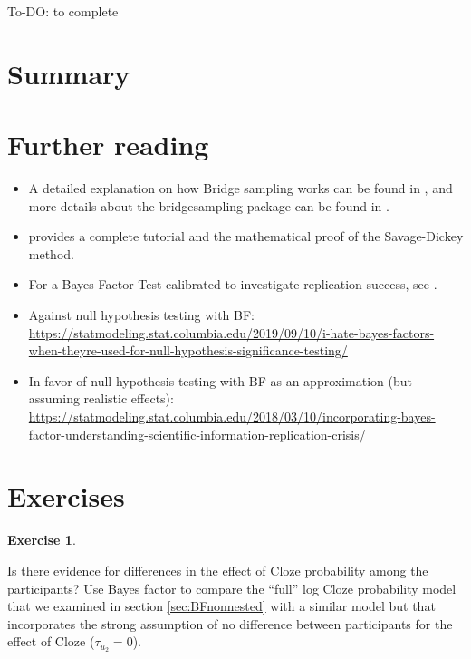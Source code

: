 \documentclass[12pt,]{krantz}
\providecommand{\tightlist}{%
  \setlength{\itemsep}{0pt}\setlength{\parskip}{0pt}}
\theoremstyle{definition}
\theoremstyle{definition}
\theoremstyle{definition}
\newtheorem{exercise}{Exercise}[chapter]
\theoremstyle{remark}
\begin{document}
To-DO: to complete

\hypertarget{summary-4}{%
\section{Summary}\label{summary-4}}

\hypertarget{further-reading-6}{%
\section{Further reading}\label{further-reading-6}}

\begin{itemize}
\tightlist
\item
  A detailed explanation on how Bridge sampling works can be found in \citet{gronauTutorialBridgeSampling2017}, and more details about the bridgesampling package can be found in \citet{gronauBridgesamplingPackageEstimating2017}.
\item
  \citet{wagenmakers2010BayesianHypothesisTesting} provides a complete tutorial and the mathematical proof of the Savage-Dickey method.
\item
  For a Bayes Factor Test calibrated to investigate replication success, see \citet{verhagenBayesianTestsQuantify2014}.
\item
  Against null hypothesis testing with BF: \url{https://statmodeling.stat.columbia.edu/2019/09/10/i-hate-bayes-factors-when-theyre-used-for-null-hypothesis-significance-testing/}
\item
  In favor of null hypothesis testing with BF as an approximation (but assuming realistic effects): \url{https://statmodeling.stat.columbia.edu/2018/03/10/incorporating-bayes-factor-understanding-scientific-information-replication-crisis/}
\end{itemize}

\hypertarget{exercises-5}{%
\section{Exercises}\label{exercises-5}}

\begin{exercise}
\protect\hypertarget{exr:byparticipants}{}{\label{exr:byparticipants} }
\end{exercise}

\vspace{-.5cm}

Is there evidence for differences in the effect of Cloze probability among the participants? Use Bayes factor to compare the ``full'' log Cloze probability model that we examined in section \ref{sec:BFnonnested} with a similar model but that incorporates the strong assumption of no difference between participants for the effect of Cloze (\(\tau_{u_2}=0\)).
\end{document}
